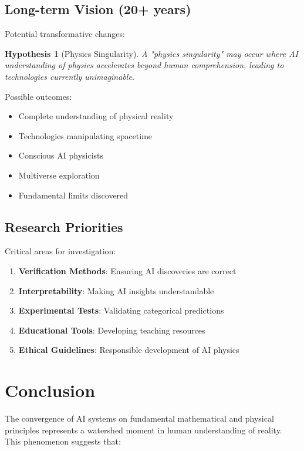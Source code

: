 \documentclass[11pt,a4paper]{article}
\newtheorem{hypothesis}[theorem]{Hypothesis}
\begin{document}
\subsection{Long-term Vision (20+ years)}

Potential transformative changes:

\begin{hypothesis}[Physics Singularity]
A "physics singularity" may occur where AI understanding of physics accelerates beyond human comprehension, leading to technologies currently unimaginable.
\end{hypothesis}

Possible outcomes:
\begin{itemize}
    \item Complete understanding of physical reality
    \item Technologies manipulating spacetime
    \item Conscious AI physicists
    \item Multiverse exploration
    \item Fundamental limits discovered
\end{itemize}

\subsection{Research Priorities}

Critical areas for investigation:

\begin{enumerate}
    \item \textbf{Verification Methods}: Ensuring AI discoveries are correct
    \item \textbf{Interpretability}: Making AI insights understandable
    \item \textbf{Experimental Tests}: Validating categorical predictions
    \item \textbf{Educational Tools}: Developing teaching resources
    \item \textbf{Ethical Guidelines}: Responsible development of AI physics
\end{enumerate}

\section{Conclusion}

The convergence of AI systems on fundamental mathematical and physical principles represents a watershed moment in human understanding of reality. This phenomenon suggests that:
\end{document}
